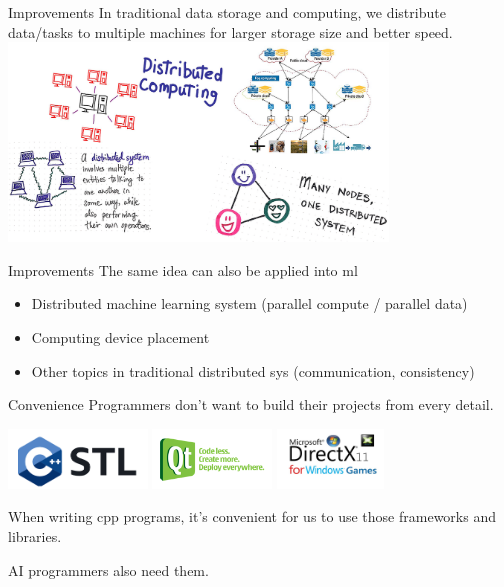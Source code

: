 \documentclass[UTF8]{beamer}
\begin{document}
\begin{frame}{Improvements}
  In traditional data storage and computing, we distribute data/tasks to multiple machines for larger storage size and better speed.
  \includegraphics[height=150pt]{figure/distributed_system.png}
\end{frame}

\begin{frame}{Improvements}
  The same idea can also be applied into ml
  \begin{itemize}
    \item <2-> Distributed machine learning system (parallel compute / parallel data)
    \item <3-> Computing device placement
    \item <4-> Other topics in traditional distributed sys (communication, consistency)
  \end{itemize}
\end{frame}

\begin{frame}{Convenience}
  Programmers don't want to build their projects from every detail. 
  
  \begin{center}
    \includegraphics[height=45pt]{figure/cpp_stl.png}
    \hfill
    \includegraphics[height=45pt]{figure/qt_logo.png}
    \hfill
    \includegraphics[height=45pt]{figure/directx.jpeg}
  \end{center}
  
  When writing cpp programs, it's convenient for us to use those frameworks and libraries.
  
  AI programmers also need them.
\end{frame}
\end{document}
